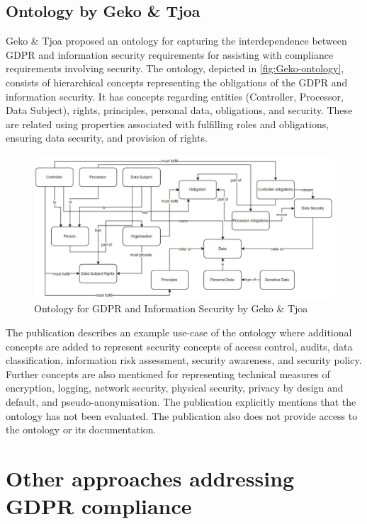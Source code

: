\subsection*{Ontology by Geko \& Tjoa}
Geko \& Tjoa \cite{geko_ontology_2018} proposed an ontology for capturing the interdependence between GDPR and information security requirements for assisting with compliance requirements involving security.
The ontology, depicted in \autoref{fig:Geko-ontology}, consists of hierarchical concepts representing the obligations of the GDPR and information security.
It has concepts regarding entities (Controller, Processor, Data Subject), rights, principles, personal data, obligations, and security. These are related using properties associated with fulfilling roles and obligations, ensuring data security, and provision of rights.
\begin{figure}[htbp]
    \centering
    \includegraphics[width=0.8\linewidth]{img/Geko_ontology.png}
    \caption{Ontology for GDPR and Information Security by Geko \& Tjoa \cite{geko_ontology_2018}}
    \label{fig:Geko-ontology}
\end{figure}

The publication describes an example use-case of the ontology where additional concepts are added to represent security concepts of access control, audits, data classification, information risk assessment, security awareness, and security policy. Further concepts are also mentioned for representing technical measures of encryption, logging, network security, physical security, privacy by design and default, and pseudo-anonymisation.
The publication explicitly mentions that the ontology has not been evaluated. The publication also does not provide access to the ontology or its documentation.

\section{Other approaches addressing GDPR compliance}\label{sec:sota:gdpr-other}

